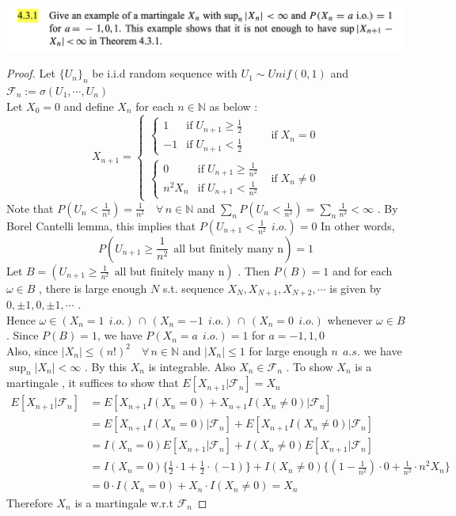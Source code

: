 \documentclass[12pt, A4]{article}
\newcommand{\N}{\mathbb{N}}
\newcommand{\F}{\mathcal{F}}
\newcommand{\intersect}{\,\cap\,}
\newcommand{\foranyn}{\quad \forall \, n\in \N}
\begin{document}
\includegraphics[width=17cm]{Exer4.3.1.png}
\begin{proof}
    Let $\{U_n\}_n$ be i.i.d random sequence with $U_1\sim Unif(0,1)$ and $\F_n:=\sigma(U_1, \cdots, U_n)$ \\ Let $X_0=0$ and define $X_n$ for each $n\in \N$ as below :
    \begin{equation*} 
        X_{n+1} =
        \begin{cases}
            \begin{cases}
                1 & \text{if}\; U_{n+1}\geq \frac{1}{2} \\
                -1 & \text{if}\; U_{n+1}< \frac{1}{2}
            \end{cases}
            & \text{if}\; X_n =0  \\
            \begin{cases}
                0 & \text{if}\; U_{n+1}\geq \frac{1}{n^2} \\
                n^2 X_n & \text{if}\; U_{n+1}< \frac{1}{n^2}
            \end{cases} & \text{if}\; X_n\neq 0
        \end{cases}
    \end{equation*}
    Note that $P(U_n<\frac{1}{n^2})=\frac{1}{n^2}\foranyn$ and $\sum_n P(U_n<\frac{1}{n^2})= \sum_n \frac{1}{n^2}<\infty$ . By Borel Cantelli lemma, this implies that $P(U_{n+1}<\frac{1}{n^2}\;\,i.o.)=0$ In other words, $$ P(U_{n+1}\geq \frac{1}{n^2}\;\,\text{all but finitely many n})=1$$
    Let $B=(U_{n+1}\geq \frac{1}{n^2}\;\,\text{all but finitely many n})$ . Then $P(B)=1$ and for each $\omega\in B$ , there is large enough $N$ s.t. sequence $X_N, X_{N+1}, X_{N+2}, \cdots$ is given by $0,\pm1, 0, \pm1, \cdots$ . \\ Hence $\omega \in (X_n=1\;\,i.o.)\intersect (X_n=-1\;\,i.o.)\intersect (X_n=0\;\,i.o.)$ whenever $\omega\in B$ . Since $P(B)=1$, we have $P(X_n=a \;\,i.o.)=1$ for $a=-1,1,0$ \\ Also, since $|X_n|\leq (n!)^2 \foranyn$ and $|X_n|\leq 1$ for large enough $n\;\,a.s.$ we have $\sup_n|X_n|<\infty$ . By this $X_n$ is integrable. Also $X_n\in \F_n$ . To show $X_n$ is a martingale , it suffices to show that $E[X_{n+1}|\F_n]=X_n$
    \begin{align*}
        E[X_{n+1}|\F_n] &=E[X_{n+1}I(X_n=0)+X_{n+1}I(X_n\neq 0)|\F_n] \\
        &= E[X_{n+1}I(X_n=0)|\F_n] +E[X_{n+1}I(X_n\neq 0)|\F_n] \\
        &= I(X_n=0)E[X_{n+1}|\F_n] + I(X_n\neq 0)E[X_{n+1}|\F_n] \\
        &= I(X_n=0)\{\frac{1}{2}\cdot 1+\frac{1}{2}\cdot (-1)\} + I(X_n\neq 0)\Big\{(1-\frac{1}{n^2})\cdot 0 + \frac{1}{n^2}\cdot n^2X_n\Big\} \\ 
        &= 0\cdot I(X_n=0) + X_n\cdot I(X_n\neq 0) = X_n
    \end{align*}
    Therefore $X_n$ is a martingale w.r.t $\F_n$
\end{proof}
\vspace{1cm}
\end{document}
